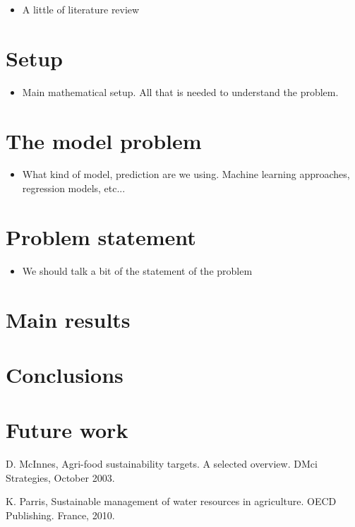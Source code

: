 \documentclass[11pt]{article}
\numberwithin{equation}{section}
\numberwithin{figure}{section}
\begin{document}
\begin{itemize}
\item A little of literature review
\end{itemize}
\section{Setup}

\begin{itemize}
\item Main mathematical setup. All that is needed to  understand the problem.
\end{itemize}
\section{The model problem}

\begin{itemize}
\item What kind of model, prediction are we using. Machine learning approaches, regression models, etc...
\end{itemize}
\section{Problem statement}

\begin{itemize}
\item We should talk a bit of the  statement of the problem 
\end{itemize}
\section{Main results}

\section{Conclusions}

\section{Future work}

\begin{thebibliography}{99}

{\sc D. McInnes},
Agri-food sustainability targets. A selected overview. DMci Strategies, October 2003.

{\sc K. Parris},
Sustainable management of water resources in agriculture. OECD Publishing. France, 2010.

 

\end{thebibliography}
\end{document}
